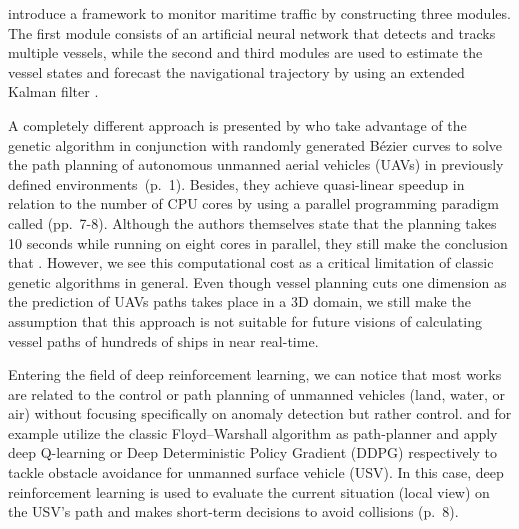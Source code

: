 \par 
\cite{perera2012maritime} introduce a framework to monitor maritime traffic by constructing three modules. The first module consists of an artificial neural network that detects and tracks multiple vessels, while the second and third modules are used to estimate the vessel states and forecast the navigational trajectory by using an extended Kalman filter \cite[p.~1]{perera2012maritime}. 
\par 
A completely different approach is presented by \cite{6198334} who take advantage of the genetic algorithm in conjunction with randomly generated Bézier curves to solve the path planning of  autonomous unmanned aerial vehicles (UAVs) in previously defined environments~(p.~1). Besides, they achieve quasi-linear speedup in relation to the number of CPU cores by using a parallel programming paradigm called  (pp.~7-8). Although the authors themselves state that the planning takes 10 seconds while running on eight cores in parallel, they still make the conclusion that  \cite[p.~9]{6198334}. However, we see this computational cost as a critical limitation of classic genetic algorithms in general. Even though vessel planning cuts one dimension as the prediction of UAVs paths takes place in a 3D domain, we still make the assumption that this approach is not suitable for future visions of calculating vessel paths of hundreds of ships in near real-time. 
\par 
Entering the field of deep reinforcement learning, we can notice that most works are related to the control or path planning of unmanned vehicles (land, water, or air) without focusing specifically on anomaly detection but rather control. \cite{etemad2020using} and \cite{zare2021continuous} for example utilize the classic Floyd–Warshall algorithm as path-planner and apply deep Q-learning or Deep Deterministic Policy Gradient (DDPG) respectively to tackle obstacle avoidance for unmanned surface vehicle (USV). In this case, deep reinforcement learning is used to evaluate the current situation (local view) on the USV's path and makes short-term decisions to avoid collisions (p.~8).


